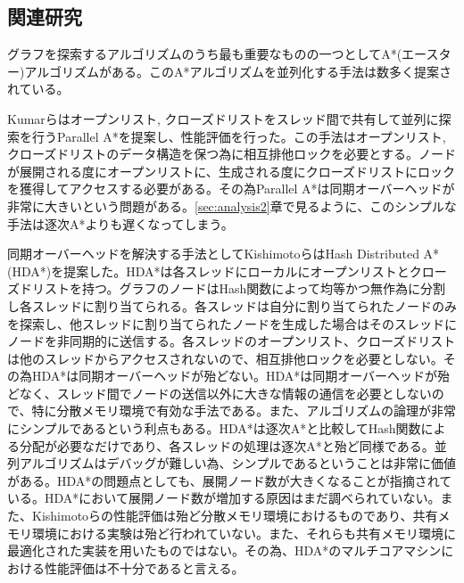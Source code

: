 \documentclass{jsarticle}
\begin{document}
\subsection{関連研究}

グラフを探索するアルゴリズムのうち最も重要なものの一つとしてA*(エースター)アルゴリズムがある\cite{Hart1968}。このA*アルゴリズムを並列化する手法は数多く提案されている。
\newline

Kumarらはオープンリスト, クローズドリストをスレッド間で共有して並列に探索を行うParallel A*を提案し、性能評価を行った\cite{Kumar1988parallel}。この手法はオープンリスト, クローズドリストのデータ構造を保つ為に相互排他ロックを必要とする。ノードが展開される度にオープンリストに、生成される度にクローズドリストにロックを獲得してアクセスする必要がある。その為Parallel A*は同期オーバーヘッドが非常に大きいという問題がある。\ref{sec:analysis2}章で見るように、このシンプルな手法は逐次A*よりも遅くなってしまう。
\newline

% 
同期オーバーヘッドを解決する手法としてKishimotoらはHash Distributed A*(HDA*)を提案した\cite{Kishimoto2013}。HDA*は各スレッドにローカルにオープンリストとクローズドリストを持つ。グラフのノードはHash関数によって均等かつ無作為に分割し各スレッドに割り当てられる。各スレッドは自分に割り当てられたノードのみを探索し、他スレッドに割り当てられたノードを生成した場合はそのスレッドにノードを非同期的に送信する。各スレッドのオープンリスト、クローズドリストは他のスレッドからアクセスされないので、相互排他ロックを必要としない。その為HDA*は同期オーバーヘッドが殆どない。HDA*は同期オーバーヘッドが殆どなく、スレッド間でノードの送信以外に大きな情報の通信を必要としないので、特に分散メモリ環境で有効な手法である。また、アルゴリズムの論理が非常にシンプルであるという利点もある。HDA*は逐次A*と比較してHash関数による分配が必要なだけであり、各スレッドの処理は逐次A*と殆ど同様である。並列アルゴリズムはデバッグが難しい為、シンプルであるということは非常に価値がある。HDA*の問題点としても、展開ノード数が大きくなることが指摘されている。HDA*において展開ノード数が増加する原因はまだ調べられていない。また、Kishimotoらの性能評価は殆ど分散メモリ環境におけるものであり、共有メモリ環境における実験は殆ど行われていない。また、それらも共有メモリ環境に最適化された実装を用いたものではない。その為、HDA*のマルチコアマシンにおける性能評価は不十分であると言える。
\newline
\end{document}
